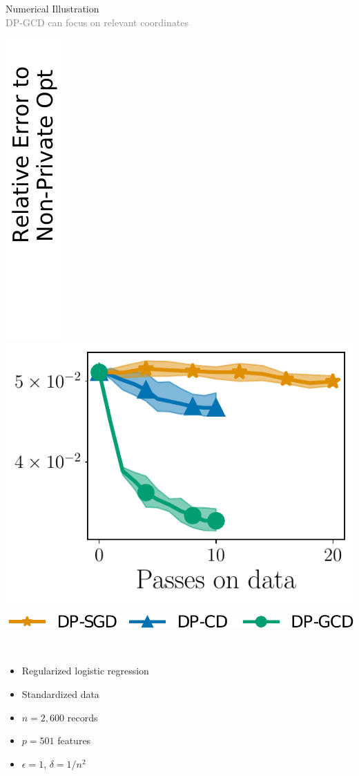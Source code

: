 \documentclass[17pt,aspectratio=169]{beamer}
\begin{document}
\begin{frame}{Numerical Illustration\\[-0.5em]
  \normalsize \textcolor{gray}{DP-GCD can focus on relevant coordinates}}

  \begin{minipage}{0.5\linewidth}
    \includegraphics[width=0.12\linewidth]{plots/xlegend.pdf}%
    \includegraphics[width=0.88\linewidth]{plots/madelon_Logistic_L2Regularizer.pdf}

    \vspace{-0.5em}

    \includegraphics[width=\linewidth]{plots/legend_cd_horizontal.pdf}
  \end{minipage}~~~~%
  \begin{minipage}{0.5\linewidth}
    \small
    \begin{itemize}
    \item Regularized logistic regression
    \item Standardized data
    \item $n=2,600$ records
    \item $p=501$ features
    \item $\epsilon=1$, $\delta=1/n^2$
    \end{itemize}
  \end{minipage}

\end{frame}
\end{document}
